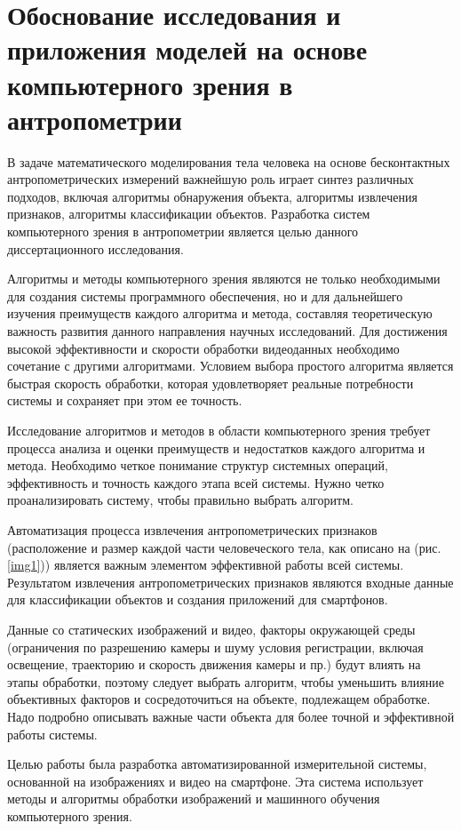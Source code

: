 \section{Обоснование исследования и приложения моделей на основе компьютерного зрения в антропометрии}

В задаче математического моделирования тела человека на основе бесконтактных антропометрических измерений важнейшую роль играет синтез различных подходов, включая алгоритмы обнаружения объекта, алгоритмы извлечения признаков, алгоритмы классификации объектов. Разработка систем компьютерного зрения в антропометрии является целью данного диссертационного исследования.


Алгоритмы и методы компьютерного зрения являются не только необходимыми для создания системы программного обеспечения, но и для дальнейшего изучения преимуществ каждого алгоритма и метода, составляя теоретическую важность развития данного направления научных исследований. Для достижения высокой эффективности и скорости обработки видеоданных необходимо сочетание с другими алгоритмами. Условием выбора простого алгоритма является быстрая скорость обработки, которая удовлетворяет реальные потребности системы и сохраняет при этом ее точность.

Исследование алгоритмов и методов в области компьютерного зрения требует процесса анализа и оценки преимуществ и недостатков каждого алгоритма и метода. Необходимо четкое понимание структур системных операций, эффективность и точность каждого этапа всей системы. Нужно четко проанализировать систему, чтобы правильно выбрать алгоритм.

Автоматизация процесса извлечения антропометрических признаков (расположение и размер каждой части человеческого тела, как описано на (рис. \ref{img1})) является важным элементом эффективной работы всей системы. Результатом извлечения антропометрических признаков являются входные данные для классификации объектов и создания приложений для смартфонов.

Данные со статических изображений и видео, факторы окружающей среды (ограничения по разрешению камеры и шуму условия регистрации, включая освещение, траекторию и скорость движения камеры и пр.) будут влиять на этапы обработки, поэтому следует выбрать алгоритм, чтобы уменьшить влияние объективных факторов и сосредоточиться на объекте, подлежащем обработке. Надо подробно описывать важные части объекта для более точной и эффективной работы системы. 

Целью работы была разработка автоматизированной измерительной системы, основанной на изображениях и видео на смартфоне. Эта система использует методы и алгоритмы обработки изображений и машинного обучения компьютерного зрения.

